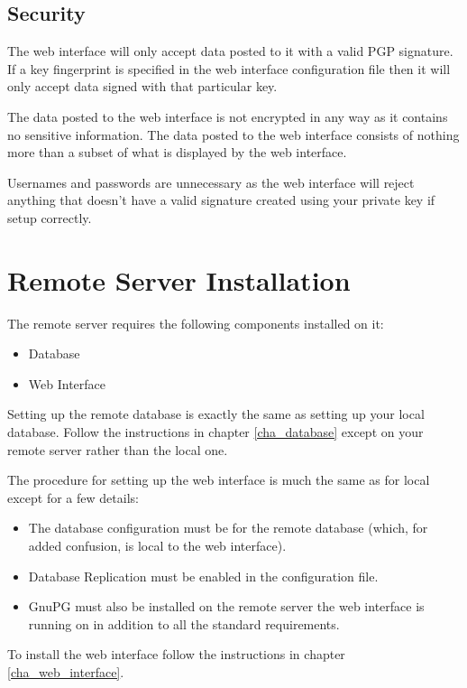 \documentclass[a4paper,10pt,draft]{book}
\begin{document}
\subsection{Security}
\label{sec_dbr_security}

The web interface will only accept data posted to it with a valid PGP signature. If a key fingerprint is specified in the web interface configuration file then it will only accept data signed with that particular key.

The data posted to the web interface is not encrypted in any way as it contains no sensitive information. The data posted to the web interface consists of nothing more than a subset of what is displayed by the web interface.

Usernames and passwords are unnecessary as the web interface will reject anything that doesn't have a valid signature created using your private key if setup correctly.


\section{Remote Server Installation}

The remote server requires the following components installed on it:
\begin{itemize}
\item Database
\item Web Interface
\end{itemize}

Setting up the remote database is exactly the same as setting up your local database. Follow the instructions in chapter \ref{cha_database} except on your remote server rather than the local one.

The procedure for setting up the web interface is much the same as for local except for a few details:
\begin{itemize}
\item The database configuration must be for the remote database (which, for added confusion, is local to the web interface).
\item Database Replication must be enabled in the configuration file.
\item GnuPG must also be installed on the remote server the web interface is running on in addition to all the standard requirements.
\end{itemize}

To install the web interface follow the instructions in chapter \ref{cha_web_interface}.
\end{document}
